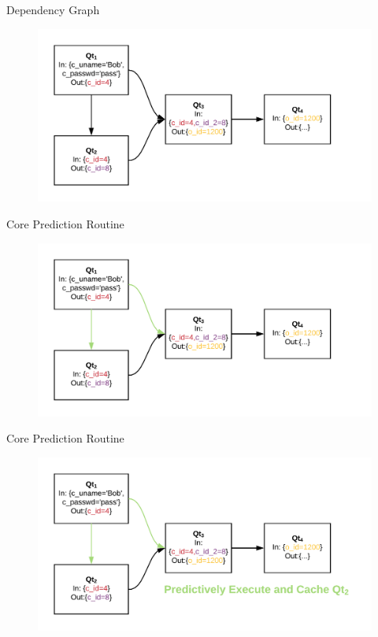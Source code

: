 \documentclass[12pt]{beamer}
\begin{document}
\begin{frame}[fragile]{Dependency Graph}
    \begin{figure}
        \hspace*{-1cm}
        \includegraphics[scale=0.22]{apollo_cpr}
    \end{figure}
\end{frame}

\begin{frame}[fragile]{Core Prediction Routine}
    \begin{figure}
        \hspace*{-1cm}
        \includegraphics[scale=0.22]{apollo_cpr_2}
    \end{figure}
\end{frame}

\begin{frame}[fragile]{Core Prediction Routine}
    \begin{figure}
        \hspace*{-1cm}
        \includegraphics[scale=0.22]{apollo_cpr_3}
    \end{figure}
\end{frame}
\end{document}
